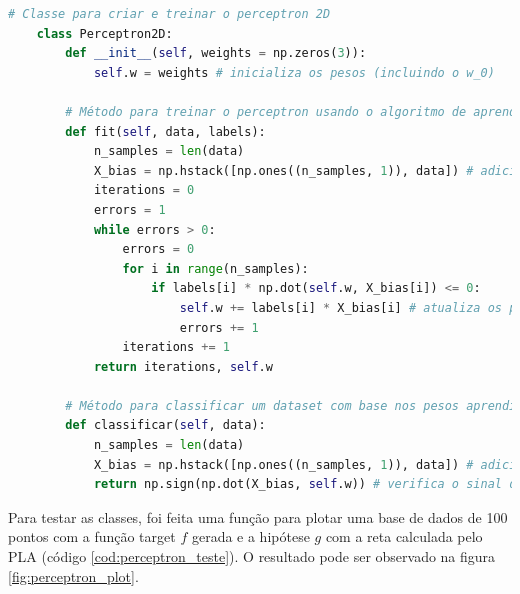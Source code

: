 \begin{lstlisting}[language=Python, caption=Perceptron, label=cod:perceptron]
    # Classe para criar e treinar o perceptron 2D
    class Perceptron2D:
        def __init__(self, weights = np.zeros(3)):
            self.w = weights # inicializa os pesos (incluindo o w_0)
        
        # Método para treinar o perceptron usando o algoritmo de aprendizagem perceptron (PLA)
        def fit(self, data, labels): 
            n_samples = len(data)
            X_bias = np.hstack([np.ones((n_samples, 1)), data]) # adiciona uma coluna de 1s para o X_0 (coordenada artificial)
            iterations = 0
            errors = 1
            while errors > 0:
                errors = 0
                for i in range(n_samples):
                    if labels[i] * np.dot(self.w, X_bias[i]) <= 0:
                        self.w += labels[i] * X_bias[i] # atualiza os pesos
                        errors += 1
                iterations += 1
            return iterations, self.w
        
        # Método para classificar um dataset com base nos pesos aprendidos.
        def classificar(self, data):
            n_samples = len(data)
            X_bias = np.hstack([np.ones((n_samples, 1)), data]) # adiciona uma coluna de 1s para o bias X_0
            return np.sign(np.dot(X_bias, self.w)) # verifica o sinal do produto escalar entre x e w
\end{lstlisting}


Para testar as classes, foi feita uma função para plotar uma base de dados de 100 pontos com a função target $f$ gerada e a hipótese $g$ com a reta calculada pelo PLA (código \ref{cod:perceptron_teste}). O resultado pode ser observado na figura \ref{fig:perceptron_plot}. 

